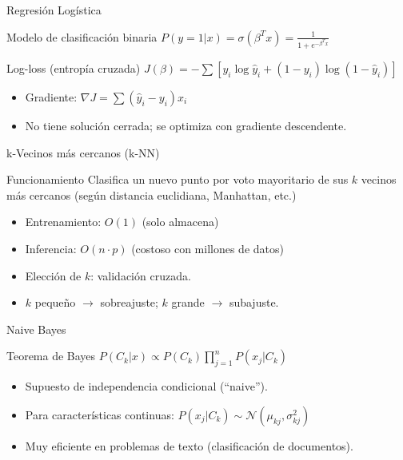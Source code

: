\documentclass[aspectratio=169, 10pt, xcolor=table]{beamer}
\begin{document}
\begin{frame}{Regresión Logística}
    \begin{block}{Modelo de clasificación binaria}
        $P(y=1|x) = \sigma(\beta^T x) = \frac{1}{1+e^{-\beta^T x}}$
    \end{block}
    \begin{alertblock}{Log-loss (entropía cruzada)}
        $J(\beta) = -\sum [y_i\log\hat{y}_i + (1-y_i)\log(1-\hat{y}_i)]$
    \end{alertblock}
    \begin{itemize}
        \item Gradiente: $\nabla J = \sum (\hat{y}_i - y_i)x_i$
        \item No tiene solución cerrada; se optimiza con gradiente descendente.
    \end{itemize}
\end{frame}

\begin{frame}{k-Vecinos más cercanos (k-NN)}
    \begin{block}{Funcionamiento}
        Clasifica un nuevo punto por voto mayoritario de sus $k$ vecinos más cercanos (según distancia euclidiana, Manhattan, etc.)
    \end{block}
    \begin{itemize}
        \item Entrenamiento: $O(1)$ (solo almacena)
        \item Inferencia: $O(n\cdot p)$ (costoso con millones de datos)
        \item Elección de $k$: validación cruzada.
        \item $k$ pequeño $\rightarrow$ sobreajuste; $k$ grande $\rightarrow$ subajuste.
    \end{itemize}
\end{frame}

\begin{frame}{Naive Bayes}
    \begin{block}{Teorema de Bayes}
        $P(C_k|x) \propto P(C_k) \prod_{j=1}^n P(x_j|C_k)$
    \end{block}
    \begin{itemize}
        \item Supuesto de independencia condicional (``naive'').
        \item Para características continuas: $P(x_j|C_k) \sim \mathcal{N}(\mu_{kj},\sigma_{kj}^2)$
        \item Muy eficiente en problemas de texto (clasificación de documentos).
    \end{itemize}
\end{frame}
\end{document}
